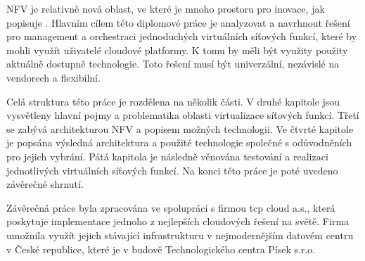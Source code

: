 NFV je relativně nová oblast, ve které je mnoho prostoru pro inovace, jak popisuje \cite{NFVChalanges}. Hlavním cílem této diplomové práce je analyzovat a navrhnout řešení pro management a orchestraci jednoduchých virtuálních síťových funkcí, které by mohli využít uživatelé cloudové platformy. K tomu by měli být využity použity aktuálně dostupně technologie. Toto řešení musí být univerzální, nezávislé na vendorech a flexibilní.

Celá struktura této práce je rozdělena na několik části. V druhé kapitole jsou vysvětleny hlavní pojmy a problematika oblasti virtualizace síťových funkcí. Třetí se zabývá architekturou NFV a popisem možných technologii. Ve čtvrté kapitole je popsána výsledná architektura a použité technologie společné s odůvodněních pro jejich vybrání. Pátá kapitola je následně věnována testování a realizaci jednotlivých virtuálních síťových funkcí. Na konci této práce je poté uvedeno závěrečné shrnutí.

Závěrečná práce byla zpracována ve spolupráci s firmou tcp cloud a.s., která poskytuje implementace jednoho z nejlepších cloudových řešení na světě. Firma umožnila využít jejich stávající infrastrukturu v nejmodernějším datovém centru v České republice, které je v budově Technologického centra Písek s.r.o.